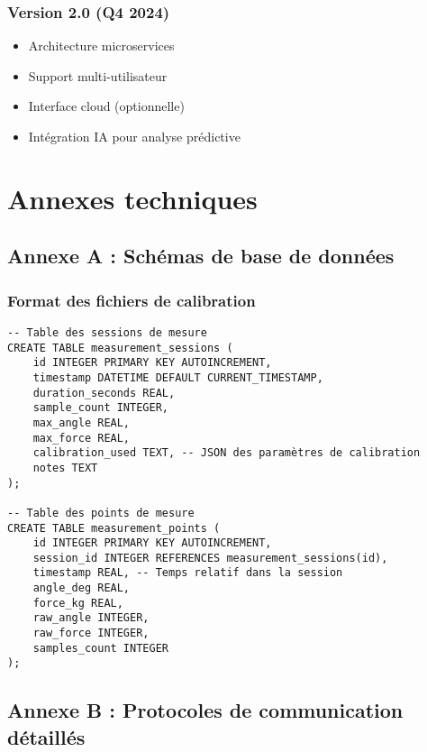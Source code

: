 \documentclass[12pt,a4paper]{article}
\begin{document}
\subsubsection{Version 2.0 (Q4 2024)}

\begin{itemize}
    \item Architecture microservices
    \item Support multi-utilisateur
    \item Interface cloud (optionnelle)
    \item Intégration IA pour analyse prédictive
\end{itemize}

\section{Annexes techniques}

\subsection{Annexe A : Schémas de base de données}

\subsubsection{Format des fichiers de calibration}

\begin{lstlisting}[caption=Structure future de la base de données]
-- Table des sessions de mesure
CREATE TABLE measurement_sessions (
    id INTEGER PRIMARY KEY AUTOINCREMENT,
    timestamp DATETIME DEFAULT CURRENT_TIMESTAMP,
    duration_seconds REAL,
    sample_count INTEGER,
    max_angle REAL,
    max_force REAL,
    calibration_used TEXT, -- JSON des paramètres de calibration
    notes TEXT
);

-- Table des points de mesure
CREATE TABLE measurement_points (
    id INTEGER PRIMARY KEY AUTOINCREMENT,
    session_id INTEGER REFERENCES measurement_sessions(id),
    timestamp REAL, -- Temps relatif dans la session
    angle_deg REAL,
    force_kg REAL,
    raw_angle INTEGER,
    raw_force INTEGER,
    samples_count INTEGER
);
\end{lstlisting}

\subsection{Annexe B : Protocoles de communication détaillés}
\end{document}
